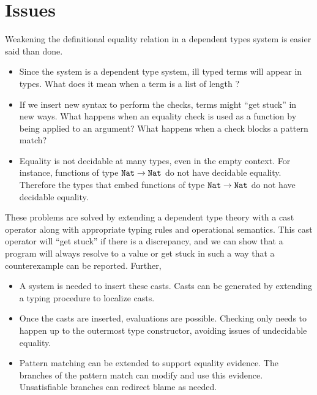 \section{Issues}
Weakening the definitional equality relation in a dependent types system is easier said than done.
\begin{itemize}
\item Since the system is a \fullSp{} dependent type system, ill typed terms will appear in types.
What does it mean when a term is a list of length \True{}?
\item If we insert new syntax to perform the checks, terms might ``get stuck'' in new ways. 
What happens when an equality check is used as a function by being applied to an argument?
What happens when a check blocks a pattern match?
\item Equality is not decidable at many types, even in the empty context.
For instance, functions of type $\mathtt{Nat}{} \rightarrow \mathtt{Nat}{}$ do not have decidable equality.
Therefore the types that embed functions of type $\mathtt{Nat}{} \rightarrow \mathtt{Nat}{}$ do not have decidable equality.
\end{itemize}

These problems are solved by extending a dependent type theory with a cast operator along with appropriate typing rules and operational semantics.
This cast operator will ``get stuck'' if there is a discrepancy, and we can show that a program will always resolve to a value or get stuck in such a way that a counterexample can be reported.
Further,

\begin{itemize}
\item A system is needed to insert these casts.
  Casts can be generated by extending a \bidir{} typing procedure to localize casts.
\item Once the casts are inserted, evaluations are possible.
Checking only needs to happen up to the outermost type constructor, avoiding issues of undecidable equality.
\item Pattern matching can be extended to support equality evidence.
The branches of the pattern match can modify and use this evidence.
Unsatisfiable branches can redirect blame as needed.
\end{itemize}

